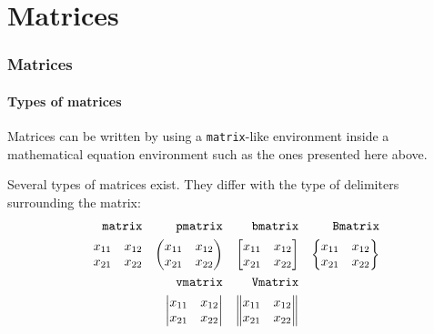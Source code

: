 \documentclass[11pt]{beamer}
\begin{document}
\section{Matrices}

\begin{frame}
	\frametitle{Matrices}
	\framesubtitle{Types of matrices}
	
	Matrices can be written by using a \texttt{matrix}-like environment inside a mathematical equation environment such as the ones presented here above.
	
	Several types of matrices exist.
	They differ with the type of delimiters surrounding the matrix:
	\begin{align*}
		\text{\texttt{matrix}} && \text{\texttt{pmatrix}} && \text{\texttt{bmatrix}} && \text{\texttt{Bmatrix}} \\
		\begin{matrix}
			x_{11} & x_{12} \\
			x_{21} & x_{22} \\
		\end{matrix} 
		&&
		\begin{pmatrix}
			x_{11} & x_{12} \\
			x_{21} & x_{22} \\
		\end{pmatrix}
		&&
		\begin{bmatrix}
			x_{11} & x_{12} \\
			x_{21} & x_{22} \\
		\end{bmatrix}
		&&
		\begin{Bmatrix}
			x_{11} & x_{12} \\
			x_{21} & x_{22} \\
		\end{Bmatrix} \\
		&& \text{\texttt{vmatrix}} && \text{\texttt{Vmatrix}} && \\
		&&
		\begin{vmatrix}
			x_{11} & x_{12} \\
			x_{21} & x_{22} \\
		\end{vmatrix}
		&&
		\begin{Vmatrix}
			x_{11} & x_{12} \\
			x_{21} & x_{22} \\
		\end{Vmatrix}
		&& \\
	\end{align*}
\end{frame}
\end{document}
